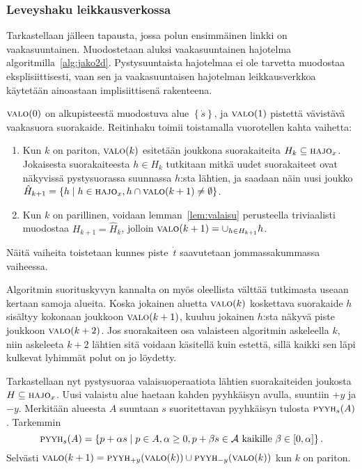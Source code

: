 \documentclass[finnish]{tktltiki2}
\theoremstyle{definition}
\theoremstyle{remark}
\newcommand\crange[2]{\ensuremath{\left [ #1 , #2 \right ]}\xspace}
\newcommand\set[1]{\ensuremath{\left\{#1\right\}}\xspace}
\newcommand\spt{\ensuremath{\dot{s}}\xspace}
\newcommand\ept{\ensuremath{\dot{t}}\xspace}
\newcommand\fspace{\ensuremath{\mathcal{A}}\xspace}
\newcommand\reach[1]{\ensuremath{\textsc{valo}(#1)}\xspace}
\newcommand\decomp[1]{\ensuremath{\textsc{hajo}_{#1}}\xspace}
\newcommand\sweep[2]{\ensuremath{\textsc{pyyh}_{#2}{(#1)}}\xspace}
\begin{document}
\subsubsection{Leveyshaku leikkausverkossa}

Tarkastellaan jälleen tapausta, jossa polun ensimmäinen linkki on vaakasuuntainen.
Muodostetaan aluksi vaakasuuntainen hajotelma algoritmilla~\ref{alg:jako2d}.
Pystysuuntaista hajotelmaa ei ole tarvetta muodostaa eksplisiittisesti, vaan sen ja vaakasuuntaisen hajotelman leikkausverkkoa käytetään ainoastaan implisiittisenä rakenteena.

\reach{0} on alkupisteestä muodostuva alue $\set{\spt}$, ja \reach{1} pistettä vävistävä vaakasuora suorakaide.
Reitinhaku toimii toistamalla vuorotellen kahta vaihetta:

\begin{enumerate}
\item Kun $k$ on pariton, \reach{k} esitetään joukkona suorakaiteita $H_k\subseteq\decomp{x}$. Jokaisesta suorakaiteesta $h\in H_k$ tutkitaan mitkä uudet suorakaiteet ovat näkyvissä pystysuorassa suunnassa $h$:sta lähtien, ja saadaan näin uusi joukko $\hat{H}_{k+1}=\set{h \mid h\in\decomp{x}, h\cap\reach{k+1}\neq\emptyset}$.
\item Kun $k$ on parillinen, voidaan lemman~\ref{lem:valaisu} perusteella triviaalisti muodostaa $H_{k+1}=\hat{H}_k$, jolloin $\reach{k+1}=\cup_{h\in H_{k+1}}h$.
\end{enumerate}

Näitä vaiheita toistetaan kunnes piste~\ept saavutetaan jommassakummassa vaiheessa.

Algoritmin suorituskyvyn kannalta on myös oleellista välttää tutkimasta useaan kertaan samoja alueita.
Koska jokainen aluetta \reach{k} koskettava suorakaide $h$ sisältyy kokonaan joukkoon \reach{k+1}, kuuluu jokainen $h$:sta näkyvä piste joukkoon \reach{k+2}.
Jos suorakaiteen osa valaisteen algoritmin askeleella $k$, niin askeleeta $k+2$ lähtien sitä voidaan käsitellä kuin estettä, sillä kaikki sen läpi kulkevat lyhimmät polut on jo löydetty.

Tarkastellaan nyt pystysuoraa valaisuoperaatiota lähtien suorakaiteiden joukosta $H\subseteq\decomp{x}$.
Uusi valaistu alue haetaan kahden pyyhkäisyn avulla, suuntiin $+y$ ja $-y$.
Merkitään alueesta $A$ suuntaan $s$ suoritettavan pyyhkäisyn tulosta \sweep{A}{s}.
Tarkemmin
$$\sweep{A}{s}=\set{p+\alpha s \mid p\in A, \alpha\ge 0, p+\beta s\in\fspace \text{ kaikille } \beta\in\crange{0}{\alpha}}.$$
Selvästi $\reach{k+1}=\sweep{\reach{k}}{+y}\cup\sweep{\reach{k}}{-y}$ kun $k$ on pariton.
\end{document}

